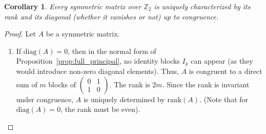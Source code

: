 \documentclass[11pt,a4paper]{article}
\newtheorem{corollary}[theorem]{Corollary}
\theoremstyle{definition}
\begin{document}
\begin{corollary}\label{cor:characterization}
	Every symmetric matrix over $\mathds{Z}_2$ is uniquely characterized by its rank and its diagonal (whether it vanishes or not) up to congruence.
\end{corollary}

\begin{proof}
	Let $A$ be a symmetric matrix.
	\begin{enumerate}
		\item If $\mathrm{diag}(A) = 0$, then in the normal form of Proposition~\ref{prop:full_principal}, no identity blocks $I_k$ can appear (as they would introduce non-zero diagonal elements). Thus, $A$ is congruent to a direct sum of $m$ blocks of $\begin{pmatrix} 0 & 1 \\ 1 & 0 \end{pmatrix}$. The rank is $2m$. Since the rank is invariant under congruence, $A$ is uniquely determined by $\mathrm{rank}(A)$. (Note that for $\mathrm{diag}(A)=0$, the rank must be even).
		

\end{enumerate}
\end{proof}
\end{document}
